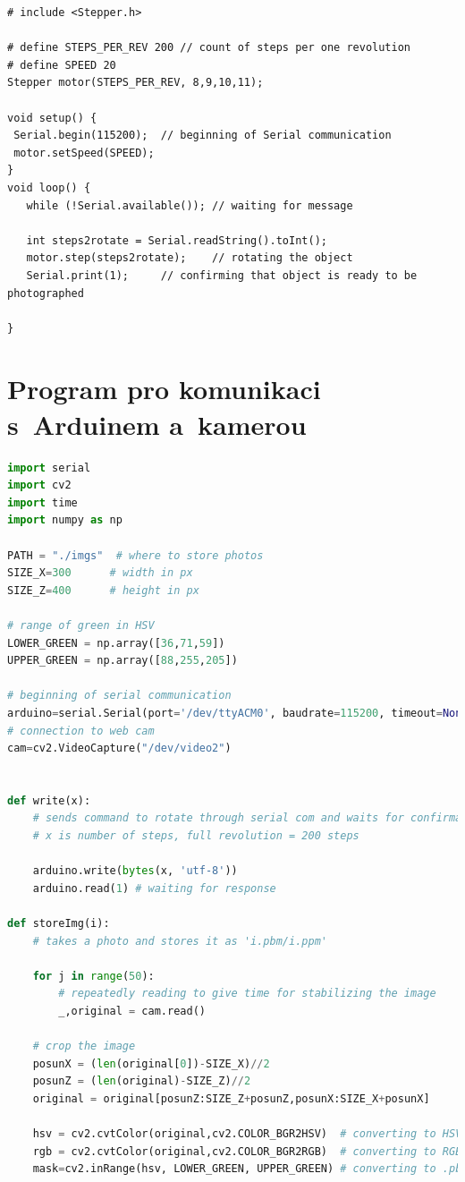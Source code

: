 \documentclass[12pt]{report}			%
\begin{document}
\begin{appendices}
        \begin{lstlisting}
# include <Stepper.h>

# define STEPS_PER_REV 200 // count of steps per one revolution
# define SPEED 20
Stepper motor(STEPS_PER_REV, 8,9,10,11);

void setup() {
 Serial.begin(115200);  // beginning of Serial communication
 motor.setSpeed(SPEED);
}
void loop() {
   while (!Serial.available()); // waiting for message
   
   int steps2rotate = Serial.readString().toInt();
   motor.step(steps2rotate);    // rotating the object
   Serial.print(1);     // confirming that object is ready to be photographed

}
        \end{lstlisting}

    \chapter{Program pro komunikaci s~Arduinem a~kamerou}

        \begin{lstlisting}[language=Python]
import serial
import cv2
import time
import numpy as np

PATH = "./imgs"  # where to store photos
SIZE_X=300      # width in px
SIZE_Z=400      # height in px

# range of green in HSV
LOWER_GREEN = np.array([36,71,59])
UPPER_GREEN = np.array([88,255,205])

# beginning of serial communication
arduino=serial.Serial(port='/dev/ttyACM0', baudrate=115200, timeout=None) 
# connection to web cam
cam=cv2.VideoCapture("/dev/video2")


def write(x):
    # sends command to rotate through serial com and waits for confirmation
    # x is number of steps, full revolution = 200 steps
    
    arduino.write(bytes(x, 'utf-8'))
    arduino.read(1) # waiting for response

def storeImg(i):
    # takes a photo and stores it as 'i.pbm/i.ppm'
    
    for j in range(50):
        # repeatedly reading to give time for stabilizing the image
        _,original = cam.read()

    # crop the image
    posunX = (len(original[0])-SIZE_X)//2 
    posunZ = (len(original)-SIZE_Z)//2  
    original = original[posunZ:SIZE_Z+posunZ,posunX:SIZE_X+posunX]

    hsv = cv2.cvtColor(original,cv2.COLOR_BGR2HSV)  # converting to HSV
    rgb = cv2.cvtColor(original,cv2.COLOR_BGR2RGB)  # converting to RGB
    mask=cv2.inRange(hsv, LOWER_GREEN, UPPER_GREEN) # converting to .pbm


\end{lstlisting}
\end{appendices}
\end{document}
